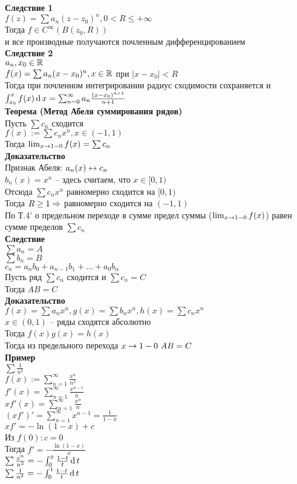 \documentclass[12pt]{article}
\begin{document}
\textbf{Следствие 1}\\
$f(z) = \sum a_n(z-z_0)^n, 0 < R \leq +\infty$\\
Тогда $f\in C^\infty(B(z_0, R))$\\
и все производные получаются почленным дифференцированием\\
\textbf{Следствие 2}\\
$a_n, x_0 \in \mathbb{R}$\\
$f(x) = \sum a_n(x-x_0)^n, x \in \mathbb{R}$ при $|x-x_0| < R$\\
Тогда при почленном интегрировании радиус сходимости сохраняется и $\int_{x_0}^x f(x)\operatorname{d} x = \sum_{n=0}^\infty a_n \frac{(x-x_0)^{n+1}}{n+1}$\\
\textbf{Теорема (Метод Абеля суммирования рядов)}\\
Пусть $\sum c_n$ сходится\\
$f(x) := \sum c_n x^n, x \in (-1, 1)$\\
Тогда $\lim_{x\rightarrow 1-0} f(x) = \sum c_n$\\
\textbf{Доказательство}\\
Признак Абеля: $a_n(x) \leftrightarrow c_n$\\
$b_n(x) = x^n$ -- здесь считаем, что $x \in [0,1)$\\
Отсюда $\sum c_nx^n$ равномерно сходится на $[0,1)$\\
Тогда $R \geq 1 \Rightarrow$ равномерно сходится на $(-1, 1)$\\
По Т.4' о предельном переходе в сумме предел суммы ($\lim_{x\rightarrow 1-0} f(x)$) равен сумме пределов $\sum c_n$\\
\textbf{Следствие}\\
$\sum a_n = A$\\
$\sum b_n = B$\\
$c_n = a_nb_0 + a_{n-1}b_1 + \ldots + a_0b_n$\\
Пусть ряд $\sum c_n$ сходится и $\sum c_n = C$\\
Тогда $AB = C$\\
\textbf{Доказательство}\\
$f(x) = \sum a_nx^n, g(x) = \sum b_nx^n, h(x) = \sum c_n x^n$\\
$x\in (0, 1)$ -- ряды сходятся абсолютно\\
Тогда $f(x)g(x) = h(x)$\\
Тогда из предельного перехода $x\rto 1-0\ AB=C$\\
\textbf{Пример}\\
$\sum \frac1{n^2}$\\
$f(x) := \sum_{n=1}^{\infty} \frac{x^n}{n^2}$\\
$f'(x) = \sum_{n=1}^\infty \frac{x^{n-1}}{n}$\\
$xf'(x) = \sum_{n=1}^\infty \frac{x^n}{n}$\\
$(xf')' = \sum_{n=1}^\infty x^{n-1} = \frac{1}{1-x}$\\
$xf' = -\ln(1-x)+c$\\
Из $f(0): c=0$\\
Тогда $f' = -\frac{\ln(1-x)}{x}$\\
$\sum \frac{x^n}{n^2} = -\int_0^x \frac{1-t}{t}\operatorname{d} t$\\
$\sum \frac1{n^2} = -\int_0^1 \frac{1-t}{t}\operatorname{d} t$\\
\end{document}
